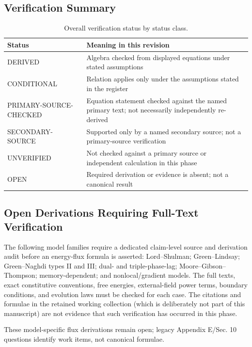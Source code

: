 \subsection{Verification Summary}

\begin{table}[htbp]
\centering
\small
\setlength{\tabcolsep}{3pt}
\caption{Overall verification status by status class.}
\label{tab:appA-summary}
\begin{tabularx}{\textwidth}{@{}lY@{}}
\toprule
\textbf{Status} & \textbf{Meaning in this revision} \\
\midrule
DERIVED & Algebra checked from displayed equations under stated assumptions \\
CONDITIONAL & Relation applies only under the assumptions stated in the register \\
PRIMARY-SOURCE-CHECKED & Equation statement checked against the named primary text; not necessarily independently re-derived \\
SECONDARY-SOURCE & Supported only by a named secondary source; not a primary-source verification \\
UNVERIFIED & Not checked against a primary source or independent calculation in this phase \\
OPEN & Required derivation or evidence is absent; not a canonical result \\
\bottomrule
\end{tabularx}
\end{table}

\subsection{Open Derivations Requiring Full-Text Verification}

The following model families require a dedicated claim-level source and derivation audit before an energy-flux formula is asserted: Lord--Shulman; Green--Lindsay; Green--Naghdi types II and III; dual- and triple-phase-lag; Moore--Gibson--Thompson; memory-dependent; and nonlocal/gradient models. The full texts, exact constitutive conventions, free energies, external-field power terms, boundary conditions, and evolution laws must be checked for each case. The citations and formulae in the retained working collection (which is deliberately not part of this manuscript) are not evidence that such verification has occurred in this phase.

These model-specific flux derivations remain open; legacy Appendix E/Sec. 10 questions identify work items, not canonical formulae.

